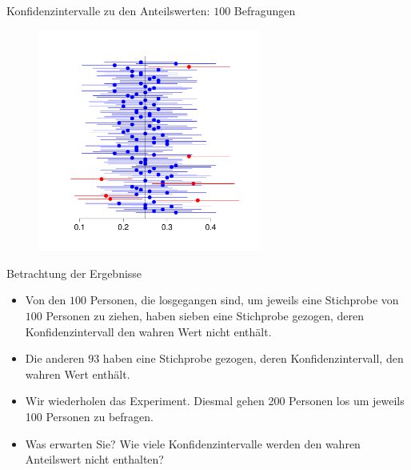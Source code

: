 \documentclass[usenames,dvipsnames,handout]{beamer}
\begin{document}
\begin{frame}{Konfidenzintervalle zu den Anteilswerten: $100$ Befragungen}
  \begin{figure}[ht]
 	\centering
 	      \includegraphics[width=0.65\textwidth]{confi.pdf}%
 	\end{figure}
\end{frame}

\begin{frame}{Betrachtung der Ergebnisse}
\begin{itemize}
\item{Von den $100$ Personen, die losgegangen sind, um jeweils eine Stichprobe von  $100$ Personen
zu ziehen, haben sieben eine Stichprobe gezogen, deren Konfidenzintervall den wahren Wert nicht
enthält.
}\pause
\item{Die anderen $93$ haben eine Stichprobe gezogen, deren Konfidenzintervall, den wahren Wert enthält.}\pause
\item{Wir wiederholen das Experiment. Diesmal gehen 200 Personen los um jeweils 100 Personen zu befragen.}\pause
\item{Was erwarten Sie? Wie viele Konfidenzintervalle werden den wahren Anteilswert nicht enthalten?}
\end{itemize}
\end{frame}
\end{document}
